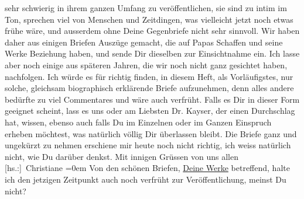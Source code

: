 \begin{ledgroupsized}[t]{13cm}
                    sehr schwierig in ihrem ganzen Umfang zu veröffentlichen, sie sind zu intim im
                    Ton, sprechen viel von Menschen und Zeitdingen, was vielleicht jetzt noch etwas
                    frühe wäre, und ausserdem ohne Deine Gegenbriefe nicht sehr sinnvoll.\pend
           \pstart
           Wir haben daher aus einigen Briefen Auszüge gemacht, die auf Papas Schaffen und seine Werke Beziehung
                    haben, und sende Dir dieselben zur Einsichtnahme ein. Ich lasse aber noch einige
                    aus späteren Jahren, die wir noch nicht ganz gesichtet haben, nachfolgen. Ich
                    würde es für richtig finden, in diesem Heft, als Vorläufigstes, nur solche,
                    gleichsam biographisch erklärende Briefe aufzunehmen, denn alles andere bedürfte
                    zu viel Commentares und wäre auch verfrüht.\pend
           \pstart
           Falls es Dir in dieser Form geeignet scheint, lass es uns oder am Liebsten Dr.
                        Kayser, der einen Durchschlag hat,
                    wissen, ebenso auch falls Du im Einzelnen oder im Ganzen Einspruch erheben
                    möchtest, was natürlich völlig Dir überlassen bleibt. Die Briefe ganz und
                    ungekürzt zu nehmen erschiene mir heute noch nicht richtig, ich weiss natürlich
                    nicht, wie Du darüber denkst.\pend
           \pstart
           Mit innigen Grüssen von uns allen{\\[\baselineskip]}\spacefill\mbox{{[}hs.:{]} Christiane}\pend
           \leftskip=0em{}\pstart
           \noindent{}{\pb}Von den schönen Briefen, \uline{Deine Werke} betreffend, halte ich den
                        jetzigen Zeitpunkt auch noch verfrüht zur Veröffentlichung, meinst Du
                        nicht?\pend
           \endnumbering{}\end{ledgroupsized}  \newcommand{\dateiname}{L02522}\newcommand{\titel}{Christiane von Hofmannsthal an Arthur Schnitzler, 3. 9. 1929}\newcommand{\editorInnen}{Martin Anton Müller und Gerd-Hermann Susen}
      